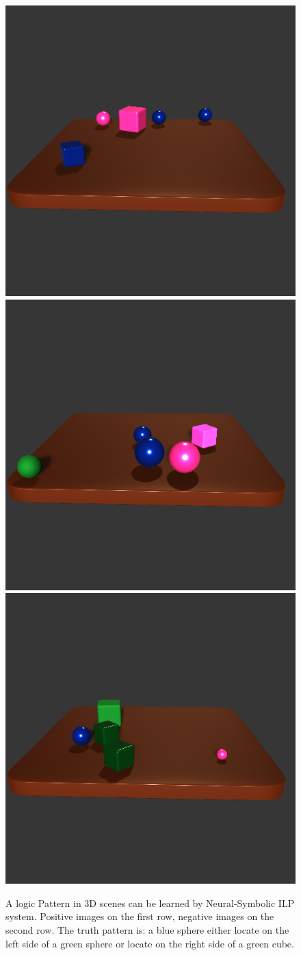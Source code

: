 \documentclass[
]{ceurart}
\begin{document}
\begin{figure}[h]
\begin{minipage}{0.4\textwidth}
		\includegraphics[width=0.3\linewidth]{img/intro_hide/false1.png} 
		\includegraphics[width=0.3\linewidth]{img/intro_hide/false2.png}
		\includegraphics[width=0.3\linewidth]{img/intro_hide/false3.png}
		\label{fig:intro-hide}
	\end{minipage}
	\caption{A logic Pattern in 3D scenes can be learned by Neural-Symbolic ILP system. Positive images on the first row, negative images on the second row. The truth pattern is: a blue sphere either locate on the left side of a green sphere or locate on the right side of a green cube.}
\end{figure}
\end{document}

